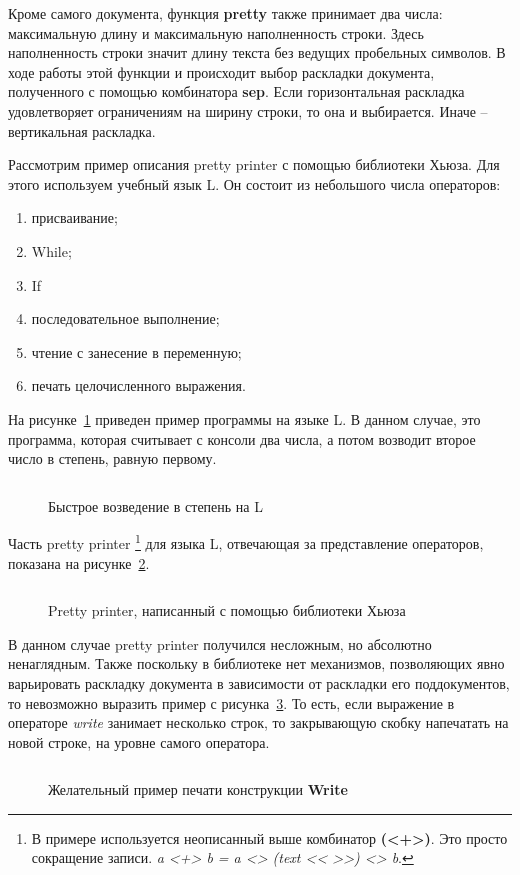 \inputminted{haskell}{codes/hughesPretty.hs}

Кроме самого документа, функция \textbf{pretty} также принимает два числа: максимальную длину и максимальную наполненность строки. Здесь наполненность строки значит длину текста без ведущих пробельных символов. В ходе работы этой функции и происходит выбор раскладки документа, полученного с помощью комбинатора \textbf{sep}. Если горизонтальная раскладка удовлетворяет ограничениям на ширину строки, то она и выбирается. Иначе -- вертикальная раскладка.



Рассмотрим пример описания pretty printer с помощью библиотеки Хьюза. Для этого используем учебный язык L. Он состоит из небольшого числа операторов:
\begin{enumerate}
\item присваивание;
\item While;
\item If
\item последовательное выполнение;
\item чтение с занесение в переменную;
\item печать целочисленного выражения.
\end{enumerate}

На рисунке~\ref{fig:lEx} приведен пример программы на языке L. В данном случае, это программа, которая считывает с консоли два числа, а потом возводит второе число в степень, равную первому.

\begin{figure}[h!]
	\centering
	\inputminted{pascal}{codes/lEx.l}
	\caption{Быстрое возведение в степень на L}
	\label{fig:lEx}
\end{figure}

Часть pretty printer
\footnote{В примере используется неописанный выше комбинатор \textbf{(<+>)}. Это просто сокращение записи. \textit{a <+> b = a <> (text << >>) <> b}. }
для языка L, отвечающая за представление операторов, показана на рисунке~\ref{fig:lHughesPrinter}.
\begin{figure}[h!]
	\inputminted{haskell}{codes/lHughesPrinter.hs}
	\caption{Pretty printer, написанный с помощью библиотеки Хьюза}
	\label{fig:lHughesPrinter}
\end{figure}

В данном случае pretty printer получился несложным, но абсолютно ненаглядным. Также поскольку в библиотеке нет механизмов, позволяющих явно варьировать раскладку документа в зависимости от раскладки его поддокументов, то невозможно выразить пример с рисунка~\ref{fig:lGoodWriteEx}. То есть, если выражение в операторе \textit{write} занимает несколько строк, то закрывающую скобку напечатать на новой строке, на уровне самого оператора.
\begin{figure}[h!]
	\inputminted{pascal}{codes/lGoodWriteEx.l}
	\caption{Желательный пример печати конструкции \textbf{Write}}
	\label{fig:lGoodWriteEx}
\end{figure}

